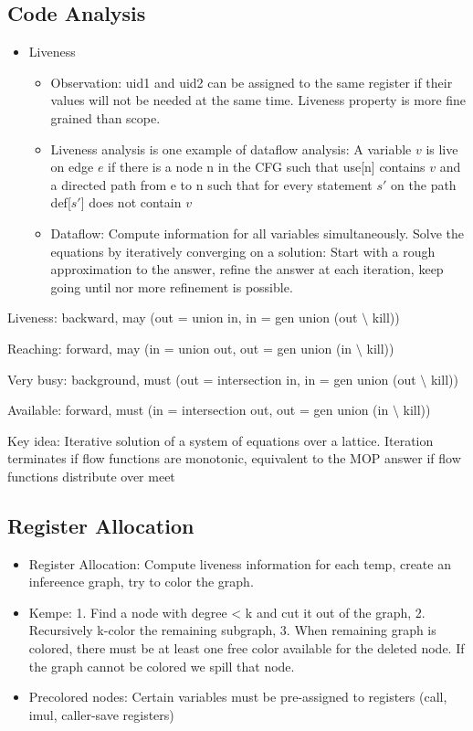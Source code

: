 \subsection*{Code Analysis}
\begin{itemize}
	\item Liveness
	\begin{itemize}
		\item Observation: uid1 and uid2 can be assigned to the same register if their values will not be needed at the same time. Liveness property is more fine grained than scope.
		\item Liveness analysis is one example of dataflow analysis: A variable $v$ is live on edge $e$ if there is a node n in the CFG such that use[n] contains $v$ and a directed path from e to n such that for every statement $s'$ on the path def[$s'$] does not contain $v$
		\item Dataflow: Compute information for all variables simultaneously. Solve the equations by iteratively converging on a solution: Start with a rough approximation to the answer, refine the answer at each iteration, keep going until nor more refinement is possible.
		\end{itemize}
		\end{itemize}
	Liveness: backward, may (out = union in, in = gen union (out $\setminus$ kill))
		
		Reaching: forward, may (in = union out, out = gen union (in $\setminus$ kill))
		
		Very busy: background, must (out = intersection in, in = gen union (out $\setminus$ kill))
		
		Available: forward, must (in = intersection out, out = gen union (in $\setminus$ kill))
		
		Key idea: Iterative solution of a system of equations over a lattice. Iteration terminates if flow functions are monotonic, equivalent to the MOP answer if flow functions distribute over meet

\subsection*{Register Allocation}
\begin{itemize}
	\item Register Allocation: Compute liveness information for each temp, create an infereence graph, try to color the graph.
	\item Kempe: 1. Find a node with degree < k and cut it out of the graph, 2. Recursively k-color the remaining subgraph, 3. When remaining graph is colored, there must be at least one free color available for the deleted node. If the graph cannot be colored we spill that node.
	\item Precolored nodes: Certain variables must be pre-assigned to registers (call, imul, caller-save registers)
\end{itemize}
